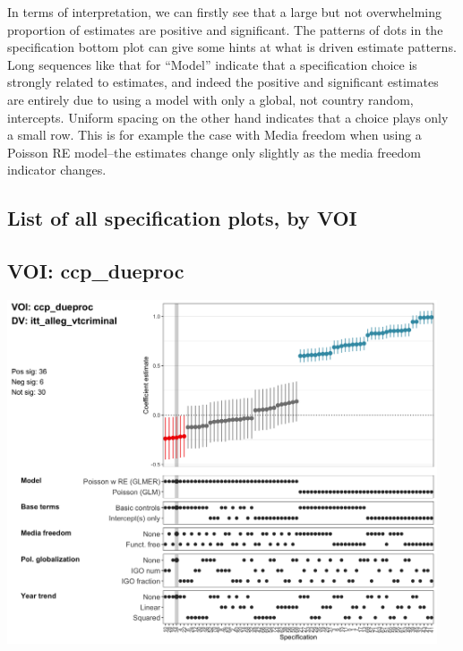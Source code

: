 \documentclass[]{article}
\begin{document}
In terms of interpretation, we can firstly see that a large but not
overwhelming proportion of estimates are positive and significant. The
patterns of dots in the specification bottom plot can give some hints at
what is driven estimate patterns. Long sequences like that for ``Model''
indicate that a specification choice is strongly related to estimates,
and indeed the positive and significant estimates are entirely due to
using a model with only a global, not country random, intercepts.
Uniform spacing on the other hand indicates that a choice plays only a
small row. This is for example the case with Media freedom when using a
Poisson RE model--the estimates change only slightly as the media
freedom indicator changes.

\hypertarget{list-of-all-specification-plots-by-voi}{%
\subsection{List of all specification plots, by
VOI}\label{list-of-all-specification-plots-by-voi}}

\hypertarget{voi-ccp_dueproc}{%
\subsection{VOI: ccp\_dueproc}\label{voi-ccp_dueproc}}

\includegraphics[height=4in]{../output/figures-robustness/specplot-ccp_dueproc-itt_alleg_vtcriminal.png}
\end{document}
